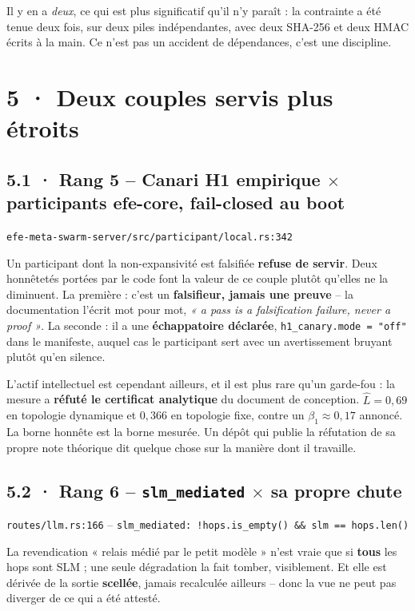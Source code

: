 \documentclass[10pt]{article}
\newcommand{\sz}[1]{{\small\color{grey}\textsf{#1}}}
\newcommand{\code}[1]{\texttt{\small #1}}
\newcommand{\x}{$\times$}
\begin{document}
Il y en a \emph{deux}, ce qui est plus significatif qu'il n'y paraît : la contrainte a été tenue deux
fois, sur deux piles indépendantes, avec deux SHA-256 et deux HMAC écrits à la main. Ce n'est pas un
accident de dépendances, c'est une discipline.

\section{5 · Deux couples servis plus étroits}

\subsection{5.1 · Rang 5 -- Canari H1 empirique \x{} participants efe-core, fail-closed au boot}

\sz{\code{efe-meta-swarm-server/src/participant/local.rs:342}}

Un participant dont la non-expansivité est falsifiée \textbf{refuse de servir}. Deux honnêtetés portées
par le code font la valeur de ce couple plutôt qu'elles ne la diminuent. La première : c'est un
\textbf{falsifieur, jamais une preuve} -- la documentation l'écrit mot pour mot, \emph{« a pass is a
falsification failure, never a proof »}. La seconde : il a une \textbf{échappatoire déclarée},
\code{h1\_canary.mode = "off"} dans le manifeste, auquel cas le participant sert avec un avertissement
bruyant plutôt qu'en silence.

L'actif intellectuel est cependant ailleurs, et il est plus rare qu'un garde-fou : la mesure a
\textbf{réfuté le certificat analytique} du document de conception. $\hat{L} = 0{,}69$ en topologie
dynamique et $0{,}366$ en topologie fixe, contre un $\beta_1 \approx 0{,}17$ annoncé. La borne honnête
est la borne mesurée. Un dépôt qui publie la réfutation de sa propre note théorique dit quelque chose
sur la manière dont il travaille.

\subsection{5.2 · Rang 6 -- \code{slm\_mediated} \x{} sa propre chute}

\sz{\code{routes/llm.rs:166} -- \code{slm\_mediated: !hops.is\_empty() \&\& slm == hops.len()}}

La revendication « relais médié par le petit modèle » n'est vraie que si \textbf{tous} les hops sont
SLM ; une seule dégradation la fait tomber, visiblement. Et elle est dérivée de la sortie
\textbf{scellée}, jamais recalculée ailleurs -- donc la vue ne peut pas diverger de ce qui a été
attesté.
\end{document}
